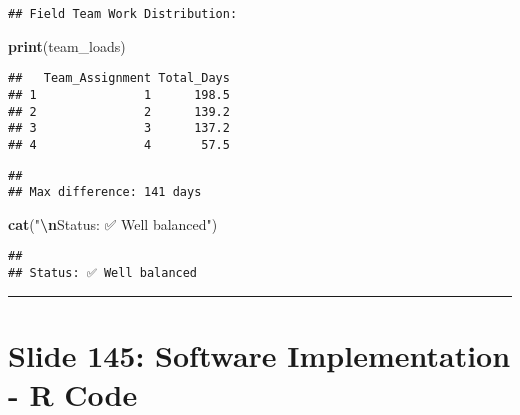 \documentclass[
]{article}
\newenvironment{Shaded}{\begin{snugshade}}{\end{snugshade}}
\newcommand{\FunctionTok}[1]{\textcolor[rgb]{0.13,0.29,0.53}{\textbf{#1}}}
\newcommand{\NormalTok}[1]{#1}
\newcommand{\SpecialCharTok}[1]{\textcolor[rgb]{0.81,0.36,0.00}{\textbf{#1}}}
\newcommand{\StringTok}[1]{\textcolor[rgb]{0.31,0.60,0.02}{#1}}
\begin{document}
\begin{verbatim}
## Field Team Work Distribution:
\end{verbatim}

\begin{Shaded}
\begin{Highlighting}[]
\FunctionTok{print}\NormalTok{(team\_loads)}
\end{Highlighting}
\end{Shaded}

\begin{verbatim}
##   Team_Assignment Total_Days
## 1               1      198.5
## 2               2      139.2
## 3               3      137.2
## 4               4       57.5
\end{verbatim}

\begin{Shaded}
\end{Shaded}

\begin{verbatim}
## 
## Max difference: 141 days
\end{verbatim}

\begin{Shaded}
\begin{Highlighting}[]
\FunctionTok{cat}\NormalTok{(}\StringTok{"}\SpecialCharTok{\textbackslash{}n}\StringTok{Status: ✅ Well balanced"}\NormalTok{)}
\end{Highlighting}
\end{Shaded}

\begin{verbatim}
## 
## Status: ✅ Well balanced
\end{verbatim}

\begin{center}\rule{0.5\linewidth}{0.5pt}\end{center}

\section{Slide 145: Software Implementation - R
Code}\label{slide-145-software-implementation---r-code}
\end{document}
